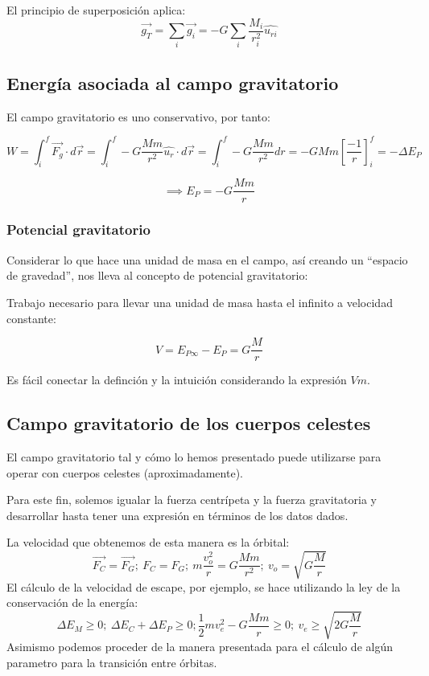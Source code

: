\documentclass[10pt]{article}
\begin{document}
\begin{remark}
  El principio de superposición aplica:
  \[ \vec{g_T} = \sum_i \vec{g_i} = -G \sum_i \frac{M_i}{r^2_i} \hat{u_{ri}} \]
\end{remark}

\subsection{Energía asociada al campo gravitatorio}

El campo gravitatorio es uno conservativo, por tanto:

\[ W = \int_i^f \vec{F_g} \cdot d\vec{r} = \int_i^f -G \frac{M m}{r^2} \hat{u_r} \cdot d\vec{r} = \int_i^f -G \frac{M m}{r^2} dr = -G M m \left[\frac{-1}{r}\right]_i^f = -\Delta E_P  \]

\[ \implies E_P = -G \frac{M m}{r} \]

\subsubsection{Potencial gravitatorio}

Considerar lo que hace una unidad de masa en el campo, así creando un ``espacio de gravedad'', nos lleva al concepto de potencial gravitatorio:

\begin{definition}
  Trabajo necesario para llevar una unidad de masa hasta el infinito a velocidad constante:

  \[ V = E_{P \infty} - E_P = G \frac{M}{r} \]
\end{definition}

Es fácil conectar la definción y la intuición considerando la expresión $ V m $.

\subsection{Campo gravitatorio de los cuerpos celestes}

El campo gravitatorio tal y cómo lo hemos presentado puede utilizarse para operar con cuerpos celestes (aproximadamente).

Para este fin, solemos igualar la fuerza centrípeta y la fuerza gravitatoria y desarrollar hasta tener una expresión en términos de los datos dados.

\begin{remark}
  La velocidad que obtenemos de esta manera es la órbital:
  \[ \vec{F_C} = \vec{F_G}; \ F_C = F_G; \ m \frac{v_o^2}{r} = G \frac{M m}{r^2}; \ v_o = \sqrt{G\frac{M}{r}}  \]
  El cálculo de la velocidad de escape, por ejemplo, se hace utilizando la ley de la conservación de la energía:
  \[ \Delta E_M \ge 0; \ \Delta E_C + \Delta E_P \ge 0; \frac{1}{2} m v_e^2 - G \frac{M m}{r} \ge 0; \ v_e \ge \sqrt{2 G \frac{M}{r}} \]
  Asimismo podemos proceder de la manera presentada para el cálculo de algún parametro para la transición entre órbitas.
\end{remark}
\end{document}
